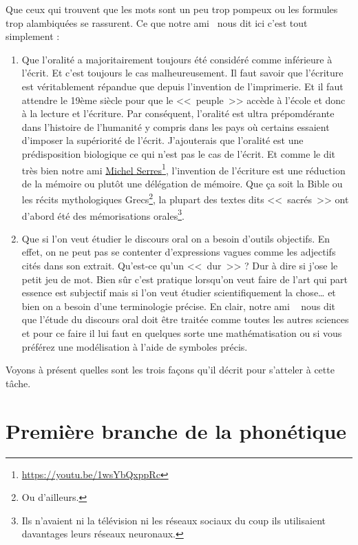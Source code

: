 Que ceux qui trouvent que les mots sont un peu trop pompeux ou les
formules trop alambiquées se rassurent. Ce que notre ami~\cite{lodge} nous
dit ici c'est tout simplement :
\begin{enumerate}
\item Que l'oralité a majoritairement toujours été considéré comme
  inférieure à l'écrit. Et c'est toujours le cas malheureusement. Il
  faut savoir que l'écriture est véritablement répandue que depuis
  l'invention de l'imprimerie. Et il faut attendre le 19ème siècle
  pour que le <<~peuple~>> accède à l'école et donc à la lecture et
  l'écriture. Par conséquent, l'oralité est ultra prépomdérante dans
  l'histoire de l'humanité y compris dans les pays où certains
  essaient d'imposer la supériorité de l'écrit. J'ajouterais que
  l'oralité est une prédisposition biologique ce qui n'est pas le cas
  de l'écrit. Et comme le dit très bien notre ami \href{https://youtu.be/1wsYbQxppRc}{Michel Serres}\footnote{\url{https://youtu.be/1wsYbQxppRc}},
  l'invention de l'écriture est une réduction de la mémoire ou plutôt
  une délégation de mémoire. Que ça soit la Bible ou les récits
  mythologiques Grecs\footnote{Ou d'ailleurs.}, la plupart des textes
  dits <<~sacrés~>> ont d'abord été des mémorisations
  orales\footnote{Ils n'avaient ni la télévision ni les réseaux
    sociaux du coup ils utilisaient davantages leurs réseaux
    neuronaux.}.
\item Que si l'on veut étudier le discours oral on a besoin d'outils
  objectifs. En effet, on ne peut pas se contenter d'expressions
  vagues comme les adjectifs cités dans son extrait. Qu'est-ce qu'un
  \son <<~dur~>> ? Dur à dire si j'ose le petit jeu de mot. Bien sûr
  c'est pratique lorsqu'on veut faire de l'art qui part essence est
  subjectif mais si l'on veut étudier scientifiquement la chose\dots{}
  et bien on a besoin d'une terminologie précise. En clair, notre ami
 ~\cite{lodge} nous dit que l'étude du discours oral doit être traitée comme
  toutes les autres sciences et pour ce faire il lui faut en quelques
  sorte une mathématisation ou si vous préférez une modélisation à
  l'aide de symboles précis.
\end{enumerate}

Voyons à présent quelles sont les trois façons qu'il décrit pour
s'atteler à cette tâche.

\newpage

\section{Première branche de la phonétique}\label{sec:phon-t1}

